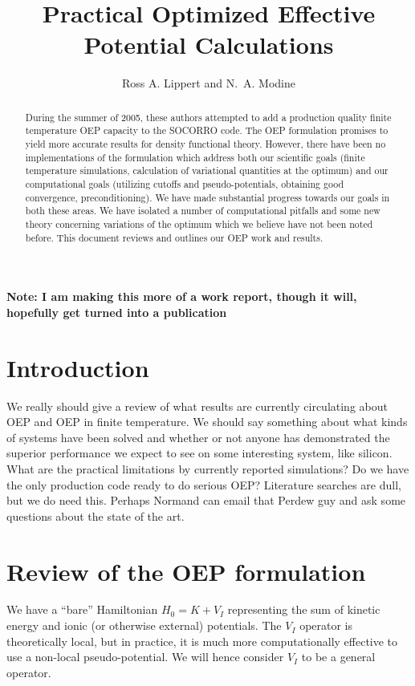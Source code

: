 \documentclass{article}
\title{{\bf Practical Optimized Effective Potential Calculations}}
\author{Ross A. Lippert and N.~A. Modine}
\newcommand{\Red}{\color{red}}
\begin{document}
\maketitle

{\bf Note: I am making this more of a work report, though it will, hopefully
get turned into a publication}

\begin{abstract}
During the summer of 2005, these authors attempted to add a production
quality finite temperature OEP capacity to the SOCORRO code.  The OEP
formulation promises to yield more accurate results for density functional
theory.  However, there have been no implementations of the formulation
which address both our scientific goals (finite temperature simulations,
calculation of variational quantities at the optimum) and our
computational goals (utilizing cutoffs and pseudo-potentials,
obtaining good convergence, preconditioning).  We have made substantial
progress towards our goals in both these areas.  We have isolated a number
of computational pitfalls and some new theory concerning variations of the
optimum which we believe have not been noted before.  This document 
reviews and outlines our OEP work and results.
\end{abstract}

\section{Introduction}

{\Red
We really should give a review of what results are currently circulating
about OEP and OEP in finite temperature.  We should say something about
what kinds of systems have been solved and whether or not anyone has
demonstrated the superior performance we expect to see on some interesting
system, like silicon.  What are the practical limitations by currently
reported simulations?  Do we have the only production code ready to do
serious OEP?  Literature searches are dull, but we do need this.  Perhaps
Normand can email that Perdew guy and ask some questions about the state
of the art.
}

\section{Review of the OEP formulation}

We have a ``bare'' Hamiltonian $H_0 = K + V_{I}$ representing
the sum of kinetic energy and ionic (or otherwise external) potentials.
The $V_{I}$ operator is theoretically local, but in practice, it is
much more computationally effective to use a non-local pseudo-potential.
We will hence consider $V_{I}$ to be a general operator.
\end{document}
